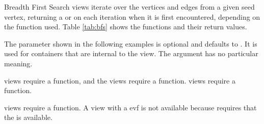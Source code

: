 Breadth First Search views iterate over the vertices and edges from a given seed vertex, returning a  
or  on each iteration when it is first encountered, depending on the function used. 
Table \ref{tab:bfs} shows the functions and their return values.

The  parameter shown in the following examples is optional and defaults to . It is used for containers 
that are internal to the view. The  argument has no particular meaning.

 views require a  function, and the  views require a  function.
 views require a  function.

 views require a  function. 
A  view with a evf is not available because  requires that the  is available.



